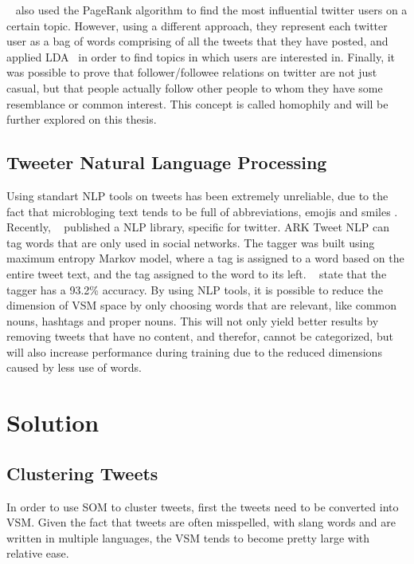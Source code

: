 \documentclass[journal]{IEEEtran}
\begin{document}
~\citet{Weng2010} also used the PageRank algorithm to find the most influential twitter users on a certain topic. However, using a different approach, they represent each twitter user as a bag of words comprising of all the tweets that they have posted, and applied \ac{LDA}~\cite{Blei2003} in order to find topics in which users are interested in. Finally, it was possible to prove that follower/followee relations on twitter are not just casual, but that people actually follow other people to whom they have some resemblance or common interest. This concept is called homophily and will be further explored on this thesis.
                                                                                                          \subsection{Tweeter Natural Language Processing}
\label{sub:tweeter_natural_language_processing}
Using standart \ac{NLP} tools on tweets has been extremely unreliable, due to the fact that microbloging text tends to be full of abbreviations, emojis and smiles . Recently, ~\citet{owoputi13improvedparth} published a \ac{NLP} library, specific for twitter. ARK Tweet \ac{NLP} can tag words that are only used in social networks. The tagger was built using maximum entropy Markov model, where a tag is assigned to a word based on the entire tweet text, and the tag assigned to the word to its left. ~\citet{owoputi13improvedparth} state that the tagger has a 93.2\% accuracy. 
By using \ac{NLP} tools, it is possible to reduce the dimension of \ac{VSM} space by only choosing words that are relevant, like common nouns, hashtags and proper nouns. This will not only yield better results by removing tweets that have no content, and therefor, cannot be categorized, but will also increase performance during training due to the reduced dimensions caused by less use of words.
 
\section{Solution}
\label{sec:solution}


\subsection{Clustering Tweets}
\label{sub:clustering_tweets}

In order to use \ac{SOM} to cluster tweets, first the tweets need to be converted into \ac{VSM}. Given the fact that tweets are often misspelled, with slang words and are written in multiple languages, the \ac{VSM} tends to become pretty large with relative ease. 
\end{document}
